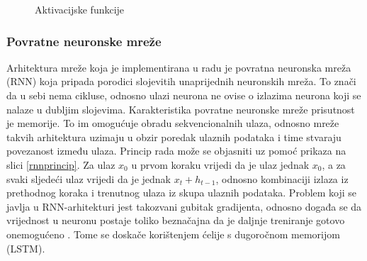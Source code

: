 \documentclass[times, utf8, zavrsni]{fer}
\begin{document}
\begin{figure}
     \centering
     \caption{Aktivacijske funkcije}
     \label{aktivacijske}
\end{figure}

\subsubsection{Povratne neuronske mreže}
Arhitektura mreže koja je implementirana u radu je povratna neuronska mreža (\gls{RNN}) koja pripada porodici slojevitih unaprijednih neuronskih mreža. To znači da u sebi nema cikluse, odnosno ulazi neurona ne ovise o izlazima neurona koji se nalaze u dubljim slojevima. Karakteristika povratne neuronske mreže prisutnost je memorije. To im omogućuje obradu sekvencionalnih ulaza, odnosno mreže takvih arhitektura uzimaju u obzir poredak ulaznih podataka i time stvaraju povezanost između ulaza. Princip rada može se objasniti uz pomoć prikaza na slici \ref{rnnprincip}. Za ulaz $x_0$ u prvom koraku vrijedi da je ulaz jednak $x_0$, a za svaki sljedeći ulaz vrijedi da je jednak $x_{t} + h_{t-1}$, odnosno kombinaciji izlaza iz prethodnog koraka i trenutnog ulaza iz skupa ulaznih podataka. Problem koji se javlja u RNN-arhitekturi jest takozvani gubitak gradijenta, odnosno događa se da vrijednost u neuronu postaje toliko beznačajna da je daljnje treniranje gotovo onemogućeno \citep{rnn_training}. Tome se doskače korištenjem ćelije s dugoročnom memorijom (\gls{LSTM}).
\end{document}
